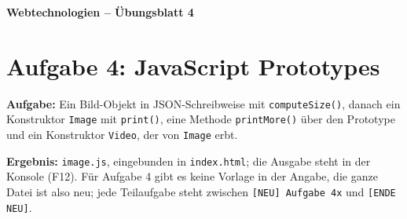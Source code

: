 \documentclass[11pt,a4paper]{article}
\begin{document}
\begin{center}
  {\Large\textbf{Webtechnologien -- Übungsblatt 4}}
\end{center}
\section*{Aufgabe 4: JavaScript Prototypes}
\textbf{Aufgabe:} Ein Bild-Objekt in JSON-Schreibweise mit
\texttt{computeSize()}, danach ein Konstruktor \texttt{Image} mit
\texttt{print()}, eine Methode \texttt{printMore()} über den Prototype und
ein Konstruktor \texttt{Video}, der von \texttt{Image} erbt.

\medskip
\textbf{Ergebnis:} \texttt{image.js}, eingebunden in \texttt{index.html};
die Ausgabe steht in der Konsole (F12). Für Aufgabe 4 gibt es keine
Vorlage in der Angabe, die ganze Datei ist also neu; jede Teilaufgabe steht
zwischen \texttt{[NEU] Aufgabe 4x} und \texttt{[ENDE NEU]}.
\end{document}

